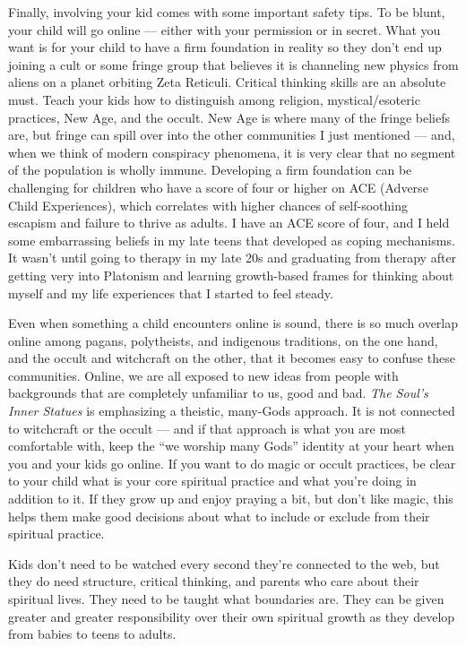 \documentclass[
]{book}
\begin{document}
Finally, involving your kid comes with some important safety tips. To be blunt, your child will go online --- either with your permission or in secret. What you want is for your child to have a firm foundation in reality so they don't end up joining a cult or some fringe group that believes it is channeling new physics from aliens on a planet orbiting Zeta Reticuli. Critical thinking skills are an absolute must. Teach your kids how to distinguish among religion, mystical/esoteric practices, New Age, and the occult. New Age is where many of the fringe beliefs are, but fringe can spill over into the other communities I just mentioned --- and, when we think of modern conspiracy phenomena, it is very clear that no segment of the population is wholly immune. Developing a firm foundation can be challenging for children who have a score of four or higher on ACE (Adverse Child Experiences), which correlates with higher chances of self-soothing escapism and failure to thrive as adults. I have an ACE score of four, and I held some embarrassing beliefs in my late teens that developed as coping mechanisms. It wasn't until going to therapy in my late 20s and graduating from therapy after getting very into Platonism and learning growth-based frames for thinking about myself and my life experiences that I started to feel steady.

Even when something a child encounters online is sound, there is so much overlap online among pagans, polytheists, and indigenous traditions, on the one hand, and the occult and witchcraft on the other, that it becomes easy to confuse these communities. Online, we are all exposed to new ideas from people with backgrounds that are completely unfamiliar to us, good and bad. \emph{The Soul's Inner Statues} is emphasizing a theistic, many-Gods approach. It is not connected to witchcraft or the occult --- and if that approach is what you are most comfortable with, keep the ``we worship many Gods'' identity at your heart when you and your kids go online. If you want to do magic or occult practices, be clear to your child what is your core spiritual practice and what you're doing in addition to it. If they grow up and enjoy praying a bit, but don't like magic, this helps them make good decisions about what to include or exclude from their spiritual practice.

Kids don't need to be watched every second they're connected to the web, but they do need structure, critical thinking, and parents who care about their spiritual lives. They need to be taught what boundaries are. They can be given greater and greater responsibility over their own spiritual growth as they develop from babies to teens to adults.
\end{document}
